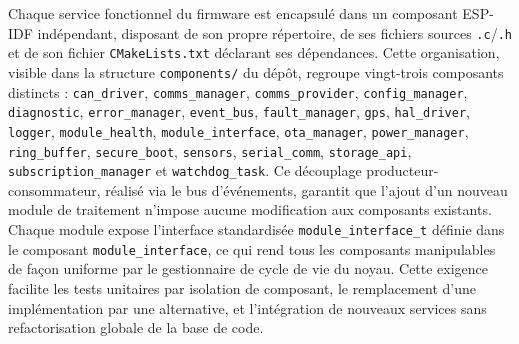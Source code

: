 Chaque service fonctionnel du firmware est encapsulé dans un composant
ESP-IDF indépendant, disposant de son propre répertoire, de ses
fichiers sources \texttt{.c}/\texttt{.h} et de son fichier
\texttt{CMakeLists.txt} déclarant ses dépendances. Cette organisation,
visible dans la structure \texttt{components/} du dépôt, regroupe
vingt-trois composants distincts : \texttt{can\_driver},
\texttt{comms\_manager}, \texttt{comms\_provider},
\texttt{config\_manager}, \texttt{diagnostic}, \texttt{error\_manager},
\texttt{event\_bus}, \texttt{fault\_manager}, \texttt{gps},
\texttt{hal\_driver}, \texttt{logger}, \texttt{module\_health},
\texttt{module\_interface}, \texttt{ota\_manager},
\texttt{power\_manager}, \texttt{ring\_buffer}, \texttt{secure\_boot},
\texttt{sensors}, \texttt{serial\_comm}, \texttt{storage\_api},
\texttt{subscription\_manager} et \texttt{watchdog\_task}. Ce
découplage producteur-consommateur, réalisé via le bus d'événements,
garantit que l'ajout d'un nouveau module de traitement n'impose aucune
modification aux composants existants. Chaque module expose
l'interface standardisée \texttt{module\_interface\_t} définie dans
le composant \texttt{module\_interface}, ce qui rend tous les
composants manipulables de façon uniforme par le gestionnaire de
cycle de vie du noyau. Cette exigence facilite les tests unitaires
par isolation de composant, le remplacement d'une implémentation par
une alternative, et l'intégration de nouveaux services sans
refactorisation globale de la base de code.


